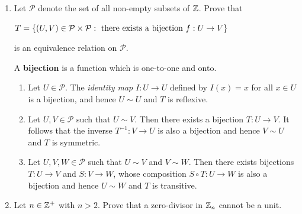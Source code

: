 \documentclass[11pt,fleqn,dvipsnames,usenames]{article}
\begin{document}
\begin{enumerate}
\item Let $\mathcal{P}$ denote the set of all non-empty subsets of $\mathbb{Z}$.  Prove that
\begin{center}
$T = \left\{(U,V)\in \mathcal{P}\times\mathcal{P}:\text{ there exists a bijection }f:U\to V\right\}$
\end{center}
is an equivalence relation on $\mathcal{P}$.
\vsmsp

\recall A \textbf{bijection} is a function which is one-to-one and onto.
\vsmsp

\solution
\begin{enumerate}[(1)]
\item Let $U\in \mathcal{P}$.  The \textit{identity map} $I:U\to U$ defined by $I(x) = x$ for all $x\in U$ is a bijection, and hence $U\sim U$ and $T$ is reflexive.
\item Let $U,V\in\mathcal{P}$ such that $U\sim V$.  Then there exists a bijection $T:U\to V$.  It follows that the inverse $T^{-1}:V\to U$ is also a bijection and hence $V\sim U$ and $T$ is symmetric.
\item Let $U,V, W\in\mathcal{P}$ such that $U\sim V$ and $V\sim W$.  Then there exists bijections $T:U\to V$ and $S:V\to W$, whose composition $S\circ T:U\to W$ is also a bijection and hence $U\sim W$ and $T$ is transitive.
\end{enumerate}
\item Let $n\in\mathbb{Z}^+$ with $n > 2$.  Prove that a zero-divisor in $\mathbb{Z}_n$ cannot be a unit.


\end{enumerate}
\end{document}
